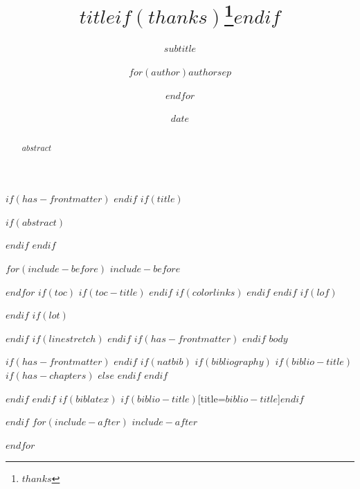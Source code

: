 \documentclass[12pt,a4paper,oneside]{memoir}
\title{$title$$if(thanks)$\thanks{$thanks$}$endif$}
\subtitle{$subtitle$}
\author{$for(author)$$author$$sep$ \and $endfor$}
\date{$date$}
\begin{document}
$if(has-frontmatter)$
\frontmatter
$endif$
$if(title)$
\maketitle
$if(abstract)$
\begin{abstract}
$abstract$
\end{abstract}
$endif$
$endif$

$for(include-before)$
$include-before$

$endfor$
$if(toc)$
$if(toc-title)$
\renewcommand*\contentsname{$toc-title$}
$endif$
{
$if(colorlinks)$
\hypersetup{linkcolor=$if(toccolor)$$toccolor$$else$$endif$}
$endif$
\setcounter{tocdepth}{$toc-depth$}
\tableofcontents
}
$endif$
$if(lof)$
\listoffigures
$endif$
$if(lot)$
\listoftables
$endif$
$if(linestretch)$
$endif$
$if(has-frontmatter)$
\mainmatter
$endif$
$body$

$if(has-frontmatter)$
\backmatter
$endif$
$if(natbib)$
$if(bibliography)$
$if(biblio-title)$
$if(has-chapters)$
\renewcommand\bibname{$biblio-title$}
$else$
\renewcommand\refname{$biblio-title$}
$endif$
$endif$


$endif$
$endif$
$if(biblatex)$
\printbibliography$if(biblio-title)$[title=$biblio-title$]$endif$

$endif$
$for(include-after)$
$include-after$

$endfor$
\end{document}
